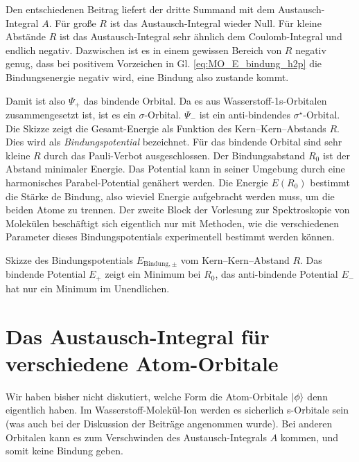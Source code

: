 Den entschiedenen Beitrag liefert der dritte Summand mit dem Austausch-Integral $A$. Für große $R$ ist das Austausch-Integral wieder Null. Für kleine Abstände $R$ ist das Austausch-Integral sehr ähnlich dem Coulomb-Integral und endlich negativ. Dazwischen ist es in einem gewissen Bereich von $R$ negativ genug, dass bei positivem Vorzeichen in Gl. \ref{eq:MO_E_bindung_h2p} die Bindungsenergie negativ wird, eine Bindung also zustande kommt.

Damit ist also $\Psi_+$ das bindende Orbital. Da es aus Wasserstoff-1s-Orbitalen zusammengesetzt ist, ist es ein $\sigma$-Orbital. $\Psi_-$ ist ein anti-bindendes $\sigma^\star$-Orbital. Die Skizze zeigt die Gesamt-Energie als Funktion des Kern--Kern--Abstands $R$. Dies wird als \emph{Bindungspotential} bezeichnet. Für das bindende Orbital sind sehr kleine $R$ durch das Pauli-Verbot ausgeschlossen.
Der Bindungsabstand $R_0$ ist der Abstand minimaler Energie. Das Potential kann in seiner Umgebung durch eine harmonisches Parabel-Potential genähert werden. Die Energie $E(R_0)$ bestimmt die Stärke de Bindung, also wieviel Energie aufgebracht werden muss, um die beiden Atome zu trennen. Der zweite Block der Vorlesung zur Spektroskopie von Molekülen beschäftigt sich eigentlich nur mit Methoden, wie die verschiedenen Parameter dieses Bindungspotentials experimentell bestimmt werden können.



\begin{marginfigure}

\caption{Skizze des Bindungspotentials $E_{\text{Bindung}, \pm}$ vom Kern--Kern--Abstand $R$. Das bindende Potential $E_+$ zeigt ein Minimum bei $R_0$, das anti-bindende Potential $E_-$ hat nur ein Minimum im Unendlichen.}
\end{marginfigure}



\section{Das Austausch-Integral für verschiedene Atom-Orbitale}

Wir haben bisher nicht diskutiert, welche Form die Atom-Orbitale $\ket{\phi}$ denn eigentlich haben.
Im Wasserstoff-Molekül-Ion   werden es sicherlich s-Orbitale sein (was auch bei der Diskussion der Beiträge angenommen wurde). Bei anderen Orbitalen kann es zum Verschwinden des Austausch-Integrals $A$ kommen, und somit keine Bindung geben.

